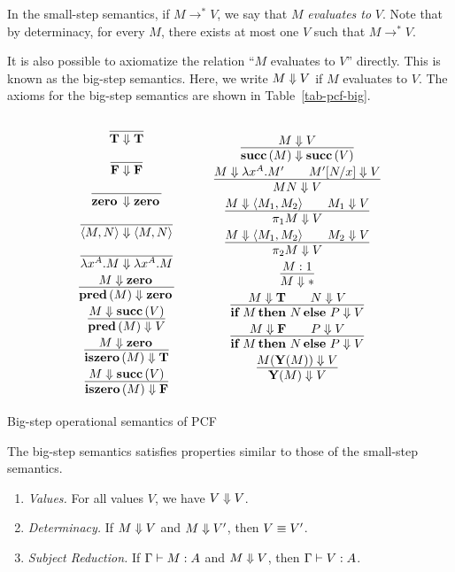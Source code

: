 \documentclass{article}
\begin{document}
In the small-step semantics, if $M\to^* V$, we say that $M$ {\em
  evaluates to} $V$. Note that by determinacy, for every $M$, there
exists at most one $V$ such that $M\to^* V$. 

It is also possible to axiomatize the relation ``$M$ evaluates to
$V$'' directly. This is known as the big-step semantics. Here, we
write $M\Downarrow V$ if $M$ evaluates to $V$. The axioms for the big-step
semantics are shown in Table~\ref{tab-pcf-big}.
\begin{table*}[t]
\[
\begin{array}{c}
  \deriv{}{\truet\evto\truet} \nl
  \deriv{}{\falset\evto\falset} \nl
  \deriv{}{\zerot\evto\zerot} \nl
  \deriv{}{\pair{M,N}\evto\pair{M,N}} \nl
  \deriv{}{\lamabs{x}{A}.M\evto\lamabs{x}{A}.M} \nl
  \deriv{M\evto\zerot}{\predt(M)\evto\zerot} \nl
  \deriv{M\evto\succt(V)}{\predt(M)\evto V} \nl
  \deriv{M\evto\zerot}{\iszerot(M)\evto\truet} \nl
  \deriv{M\evto\succt(V)}{\iszerot(M)\evto\falset} \nl
\end{array}
\sep
\begin{array}{c}
  \deriv{M\evto V}{\succt(M)\evto\succt(V)} \nl
  \deriv{M\evto\lamabs{x}{A}.M'\sep\subst{M'}{N}{x}\evto V}{MN\evto V} \nl
  \deriv{M\evto\pair{M_1,M_2}\sep M_1\evto V}{\proj1 M\evto V} \nl
  \deriv{M\evto\pair{M_1,M_2}\sep M_2\evto V}{\proj2 M\evto V} \nl
  \deriv{M:1}{M\evto\unit} \nl
  \deriv{M\evto\truet\sep N\evto V}{\ite{M}{N}{P}\evto V} \nl
  \deriv{M\evto\falset\sep P\evto V}{\ite{M}{N}{P}\evto V} \nl
  \deriv{M(\Y(M))\evto V}{\Y(M)\evto V}
\end{array}
\]
\caption{Big-step operational semantics of PCF}
\label{tab-pcf-big}
\end{table*}

The big-step semantics satisfies properties similar to those of the
small-step semantics.

\begin{lemma}
  \begin{enumerate}
  \item {\em Values.} For all values $V$, we have $V\Downarrow V$.
  \item {\em Determinacy.} If $M\Downarrow V$ and $M\Downarrow V'$, then
    $V\equiv V'$.
  \item {\em Subject Reduction.} If $\Gamma\vdash M:A$ and $M\Downarrow V$,
    then $\Gamma\vdash V:A$.
  \end{enumerate}
\end{lemma}
\end{document}
